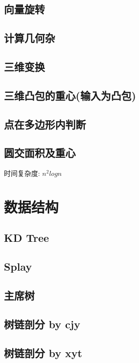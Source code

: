 \documentclass[landscape,a4paper]{article}
\begin{document}
\begin{spacing}{0.3}
\begin{multicols}{2}
	
	\subsection{向量旋转}
		
		\subsection{计算几何杂}
		
		\subsection{三维变换}
		
	\subsection{三维凸包的重心(输入为凸包)}
		
	\subsection{点在多边形内判断}
		
	\subsection{圆交面积及重心}
		时间复杂度: $n^2logn$
		
		
	
	
		
	\section{数据结构}
		\subsection{KD Tree}
		
		\subsection{Splay}
		
		\subsection{主席树}
		
		\subsection{树链剖分 by cjy}
		
		\subsection{树链剖分 by xyt}
		

\end{multicols}
\end{spacing}
\end{document}
